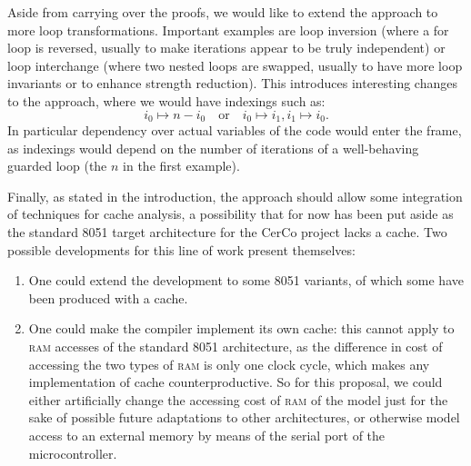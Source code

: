 \documentclass[submission,copyright,creativecommons]{eptcs}
\theoremstyle{definition}
\begin{document}
Aside from carrying over the proofs, we would like to extend the approach to more loop transformations.
Important examples are loop inversion (where a for loop is reversed, usually to make iterations appear to be truly independent) or loop interchange (where two nested loops are swapped, usually to have more loop invariants or to enhance strength reduction).
This introduces interesting changes to the approach, where we would have indexings such as:
$$i_0\mapsto n - i_0\quad\text{or}\quad i_0\mapsto i_1, i_1\mapsto i_0.$$
In particular dependency over actual variables of the code would enter the frame, as indexings would depend on the number of iterations of a well-behaving guarded loop (the $n$ in the first example).

Finally, as stated in the introduction, the approach should allow some integration of techniques for cache analysis, a possibility that for now has been put aside as the standard 8051 target architecture for the CerCo project lacks a cache.
Two possible developments for this line of work present themselves:
\begin{enumerate}
\item
One could extend the development to some 8051 variants, of which some have been produced with a cache.
\item
One could make the compiler implement its own cache: this cannot apply to \textsc{ram} accesses of the standard 8051 architecture, as the difference in cost of accessing the two types of \textsc{ram} is only one clock cycle, which makes any implementation of cache counterproductive.
So for this proposal, we could either artificially change the accessing cost of \textsc{ram} of the model just for the sake of possible future adaptations to other architectures, or otherwise model access to an external memory by means of the serial port of the microcontroller.
\end{enumerate}




\end{document}
